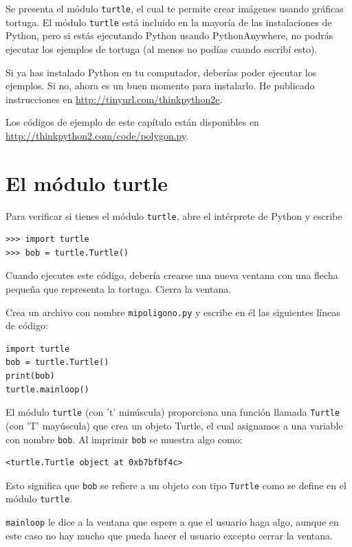 \documentclass[10pt]{book}
\begin{document}
Se presenta el módulo {\tt turtle}, el cual te permite
crear imágenes usando gráficas tortuga.  El módulo {\tt turtle}
está incluido en la mayoría de las instalaciones de Python, pero si estás ejecutando Python
usando PythonAnywhere, no podrás ejecutar los ejemplos de tortuga (al
menos no podías cuando escribí esto).

Si ya has instalado Python en tu computador, deberías
poder ejecutar los ejemplos.  Si no, ahora es un buen momento
para instalarlo.  He publicado instrucciones en
\url{http://tinyurl.com/thinkpython2e}.

Los códigos de ejemplo de este capítulo están disponibles en
\url{http://thinkpython2.com/code/polygon.py}.


\section{El módulo turtle}
\label{turtle}

Para verificar si tienes el módulo {\tt turtle}, abre el intérprete de Python
y escribe

\begin{verbatim}
>>> import turtle
>>> bob = turtle.Turtle()
\end{verbatim}

Cuando ejecutes este código, debería crearse una nueva ventana
con una flecha pequeña que representa la tortuga.  Cierra la ventana.

Crea un archivo con nombre {\tt mipoligono.py} y escribe en él las siguientes
líneas de código:

\begin{verbatim}
import turtle
bob = turtle.Turtle()
print(bob)
turtle.mainloop()
\end{verbatim}
%
El módulo {\tt turtle} (con 't' minúscula) proporciona una función
llamada {\tt Turtle} (con 'T' mayúscula) que crea un objeto Turtle,
el cual asignamos a una variable con nombre {\tt bob}.
Al imprimir {\tt bob} se muestra algo como:

\begin{verbatim}
<turtle.Turtle object at 0xb7bfbf4c>
\end{verbatim}
%
Esto significa que {\tt bob} se refiere a un objeto con tipo
{\tt Turtle}
como se define en el módulo {\tt turtle}.

\verb"mainloop" le dice a la ventana que espere a que el usuario
haga algo, aunque en este caso no hay mucho que pueda hacer
el usuario excepto cerrar la ventana.
\end{document}
